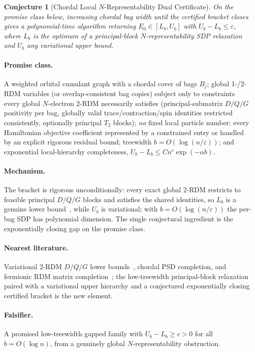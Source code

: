 \documentclass[11pt]{article}
\newtheorem{conjecture}{Conjecture}
\theoremstyle{definition}
\newcommand{\eps}{\varepsilon}
\begin{document}
\begin{conjecture}[Chordal Local $N$-Representability Dual Certificate]\label{p12}
On the promise class below, increasing chordal bag width until the certified
bracket closes gives a polynomial-time algorithm returning
$E_0\in[L_b,U_b]$ with $U_b-L_b\le\eps$, where $L_b$ is the optimum of a
principal-block $N$-representability SDP relaxation and $U_b$ any variational
upper bound.
\end{conjecture}
\paragraph{Promise class.}  A weighted orbital cumulant graph with a chordal cover
of bags $B_j$; global 1-/2-RDM variables (or overlap-consistent bag copies)
subject only to constraints every global $N$-electron 2-RDM necessarily satisfies
(principal-submatrix $D/Q/G$ positivity per bag, globally valid
trace/contraction/spin identities restricted consistently, optionally principal
$T_2$ blocks); \emph{no} fixed local particle number; every Hamiltonian objective
coefficient represented by a constrained entry or handled by an explicit rigorous
residual bound; treewidth $b=O(\log(n/\eps))$; and exponential local-hierarchy
completeness, $U_b-L_b\le Cn^c\exp(-\alpha b)$.
\paragraph{Mechanism.}  The bracket is rigorous unconditionally: every exact
global 2-RDM restricts to feasible principal $D/Q/G$ blocks and satisfies the
shared identities, so $L_b$ is a genuine lower bound~\cite{R21}, while $U_b$ is
variational; with $b=O(\log(n/\eps))$ the per-bag SDP has polynomial dimension.
The single conjectural ingredient is the exponentially closing gap on the promise
class.
\paragraph{Nearest literature.}  Variational 2-RDM $D/Q/G$ lower bounds~\cite{R21},
chordal PSD completion, and fermionic RDM matrix completion~\cite{R23,R24}; the
low-treewidth principal-block relaxation paired with a variational upper hierarchy
and a conjectured exponentially closing certified bracket is the new element.
\paragraph{Falsifier.}  A promised low-treewidth gapped family with
$U_b-L_b\ge c>0$ for all $b=O(\log n)$, from a genuinely global
$N$-representability obstruction.
\end{document}
